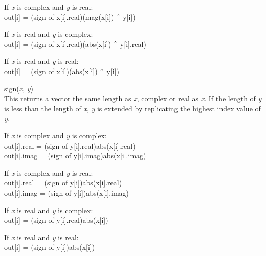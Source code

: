 \begin{description}
\begin{description}
\item{If {\it x} is complex and {\it y} is real:}\\
  {\vt out[i] =} (sign of {\vt x[i].real})({\vt mag(x[i])} $\symbol{94}$
  {\vt y[i]})

\item{If {\it x} is real and {\it y} is complex:}\\
  {\vt out[i] =} (sign of {\vt x[i].real})({\vt abs(x[i])} $\symbol{94}$
  {\vt y[i].real})

\item{If {\it x} is real and {\it y} is real:}\\
  {\vt out[i] =} (sign of {\vt x[i]})({\vt abs(x[i])} $\symbol{94}$ {\vt y[i]})
\end{description}

\item{\vt sign}({\it x\/}, {\it y\/})\\
This returns a vector the same length as {\it x\/}, complex or real as
{\it x\/}.  If the length of {\it y} is less than the length of {\it
x\/}, {\it y} is extended by replicating the highest index value of
{\it y\/}.

\begin{description}
\item{If {\it x} is complex and {\it y} is complex:}\\
  {\vt out[i].real =} (sign of {\vt y[i].real}){\vt abs(x[i].real)}\\
  {\vt out[i].imag =} (sign of {\vt y[i].imag}){\vt abs(x[i].imag)}

\item{If {\it x} is complex and {\it y} is real:}\\
  {\vt out[i].real =} (sign of {\vt y[i]}){\vt abs(x[i].real)}\\
  {\vt out[i].imag =} (sign of {\vt y[i]}){\vt abs(x[i].imag)}

\item{If {\it x} is real and {\it y} is complex:}\\
  {\vt out[i] =} (sign of {\vt y[i].real}){\vt abs(x[i])}

\item{If {\it x} is real and {\it y} is real:}\\
  {\vt out[i] =} (sign of {\vt y[i]}){\vt abs(x[i])}
\end{description}
\end{description}

